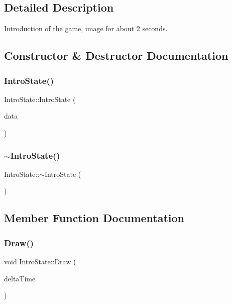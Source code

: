 \subsection{Detailed Description}
Introduction of the game, image for about 2 seconds. 

\subsection{Constructor \& Destructor Documentation}
\mbox{\label{classIntroState_ab4dc575c648c2589c7b110f5c930601c}} 
\subsubsection{\texorpdfstring{Intro\+State()}{IntroState()}}
{\footnotesize\ttfamily Intro\+State\+::\+Intro\+State (\begin{DoxyParamCaption}\item[{\mbox{\hyperlink{Game_8h_aff850703a7797c8bfee2f02906aec50c}{Game\+Data\+Ref}}}]{data }\end{DoxyParamCaption})}

\mbox{\label{classIntroState_a33fe62d2ddc9d079f716016674090b05}} 
\subsubsection{\texorpdfstring{$\sim$\+Intro\+State()}{~IntroState()}}
{\footnotesize\ttfamily Intro\+State\+::$\sim$\+Intro\+State (\begin{DoxyParamCaption}{ }\end{DoxyParamCaption})}



\subsection{Member Function Documentation}
\mbox{\label{classIntroState_a903b8e2b781eae1e9a6e7db08d38fd2c}} 
\subsubsection{\texorpdfstring{Draw()}{Draw()}}
{\footnotesize\ttfamily void Intro\+State\+::\+Draw (\begin{DoxyParamCaption}\item[{float}]{delta\+Time }\end{DoxyParamCaption})\hspace{0.3cm}{\ttfamily [virtual]}}




